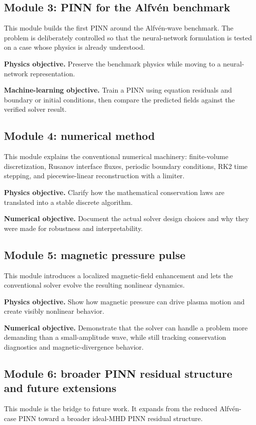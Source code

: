 \documentclass[11pt]{article}
\begin{document}
\subsection{Module 3: PINN for the Alfv\'en benchmark}
This module builds the first PINN around the Alfv\'en-wave benchmark. The problem is deliberately controlled so that the neural-network formulation is tested on a case whose physics is already understood.

\textbf{Physics objective.} Preserve the benchmark physics while moving to a neural-network representation.

\textbf{Machine-learning objective.} Train a PINN using equation residuals and boundary or initial conditions, then compare the predicted fields against the verified solver result.

\subsection{Module 4: numerical method}
This module explains the conventional numerical machinery: finite-volume discretization, Rusanov interface fluxes, periodic boundary conditions, RK2 time stepping, and piecewise-linear reconstruction with a limiter.

\textbf{Physics objective.} Clarify how the mathematical conservation laws are translated into a stable discrete algorithm.

\textbf{Numerical objective.} Document the actual solver design choices and why they were made for robustness and interpretability.

\subsection{Module 5: magnetic pressure pulse}
This module introduces a localized magnetic-field enhancement and lets the conventional solver evolve the resulting nonlinear dynamics.

\textbf{Physics objective.} Show how magnetic pressure can drive plasma motion and create visibly nonlinear behavior.

\textbf{Numerical objective.} Demonstrate that the solver can handle a problem more demanding than a small-amplitude wave, while still tracking conservation diagnostics and magnetic-divergence behavior.

\subsection{Module 6: broader PINN residual structure and future extensions}
This module is the bridge to future work. It expands from the reduced Alfv\'en-case PINN toward a broader ideal-MHD PINN residual structure.
\end{document}
